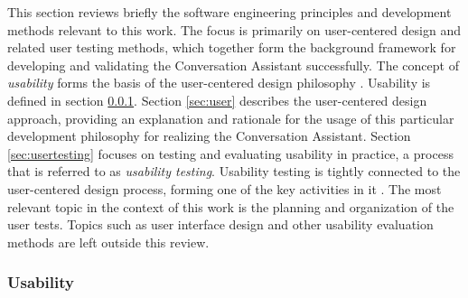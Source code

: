 \documentclass[english, 12pt, a4paper, pdftex, elec, utf8]{aaltothesis}
\begin{document}
This section reviews briefly the software engineering principles and development methods relevant to this work. The focus is primarily on user-centered design and related user testing methods, which together form the background framework for developing and validating the Conversation Assistant successfully. The concept of \textit{usability} forms the basis of the user-centered design philosophy \cite{richter2014user, deuff2013user}. Usability is defined in section \ref{sec:usability}. Section \ref{sec:user} describes the user-centered design approach, providing an explanation and rationale for the usage of this particular development philosophy for realizing the Conversation Assistant. Section \ref{sec:usertesting} focuses on testing and evaluating usability in practice, a process that is referred to as \textit{usability testing}. Usability testing is tightly connected to the user-centered design process, forming one of the key activities in it \cite{rubin2008handbook}. The most relevant topic in the context of this work is the planning and organization of the user tests. Topics such as user interface design and other usability evaluation methods are left outside this review.

\subsubsection{Usability} \label{sec:usability}
\end{document}
